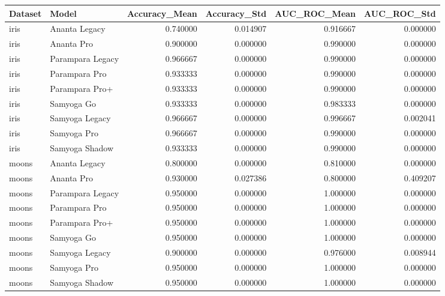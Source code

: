 \begin{tabular}{llrrrr}
\toprule
Dataset & Model & Accuracy_Mean & Accuracy_Std & AUC_ROC_Mean & AUC_ROC_Std \\
\midrule
iris & Ananta Legacy & 0.740000 & 0.014907 & 0.916667 & 0.000000 \\
iris & Ananta Pro & 0.900000 & 0.000000 & 0.990000 & 0.000000 \\
iris & Parampara Legacy & 0.966667 & 0.000000 & 0.990000 & 0.000000 \\
iris & Parampara Pro & 0.933333 & 0.000000 & 0.990000 & 0.000000 \\
iris & Parampara Pro+ & 0.933333 & 0.000000 & 0.990000 & 0.000000 \\
iris & Samyoga Go & 0.933333 & 0.000000 & 0.983333 & 0.000000 \\
iris & Samyoga Legacy & 0.966667 & 0.000000 & 0.996667 & 0.002041 \\
iris & Samyoga Pro & 0.966667 & 0.000000 & 0.990000 & 0.000000 \\
iris & Samyoga Shadow & 0.933333 & 0.000000 & 0.990000 & 0.000000 \\
moons & Ananta Legacy & 0.800000 & 0.000000 & 0.810000 & 0.000000 \\
moons & Ananta Pro & 0.930000 & 0.027386 & 0.800000 & 0.409207 \\
moons & Parampara Legacy & 0.950000 & 0.000000 & 1.000000 & 0.000000 \\
moons & Parampara Pro & 0.950000 & 0.000000 & 1.000000 & 0.000000 \\
moons & Parampara Pro+ & 0.950000 & 0.000000 & 1.000000 & 0.000000 \\
moons & Samyoga Go & 0.950000 & 0.000000 & 1.000000 & 0.000000 \\
moons & Samyoga Legacy & 0.900000 & 0.000000 & 0.976000 & 0.008944 \\
moons & Samyoga Pro & 0.950000 & 0.000000 & 1.000000 & 0.000000 \\
moons & Samyoga Shadow & 0.950000 & 0.000000 & 1.000000 & 0.000000 \\
\bottomrule
\end{tabular}
